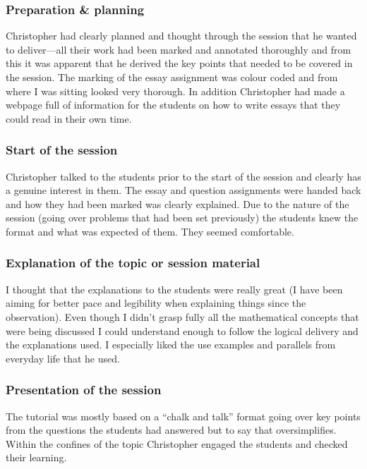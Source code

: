 \subsubsection{Preparation \& planning}\label{sec:A-preparation}

Christopher had clearly planned and thought through the session that he wanted to deliver---all their work had been marked and annotated thoroughly and from this it was apparent that he derived the key points that needed to be covered in the session. The marking of the essay assignment was colour coded and from where I was sitting looked very thorough. In addition Christopher had made a webpage full of information for the students on how to write essays that they could read in their own time.

\subsubsection{Start of the session}\label{sec:A-start}

Christopher talked to the students prior to the start of the session and clearly has a genuine interest in them. The essay and question assignments were handed back and how they had been marked was clearly explained. Due to the nature of the session (going over problems that had been set previously) the students knew the format and what was expected of them. They seemed comfortable.

\subsubsection{Explanation of the topic or session material}\label{sec:A-topic}

I thought that the explanations to the students were really great (I have been aiming for better pace and legibility when explaining things since the observation). Even though I didn't grasp fully all the mathematical concepts that were being discussed I could understand enough to follow the logical delivery and the explanations used. I especially liked the use examples and parallels from everyday life that he used.

\subsubsection{Presentation of the session}\label{sec:A-presentation}

The tutorial was mostly based on a ``chalk and talk'' format going over key points from the questions the students had answered but to say that oversimplifies. Within the confines of the topic Christopher engaged the students and checked their learning.

